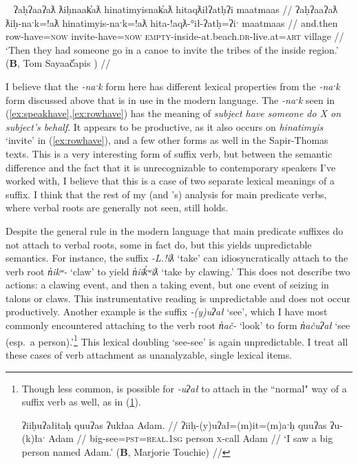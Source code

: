 \ex~ \label{ex:rowhave}
\begingl
\glpreamble ʔaḥʔaaʔaƛ ƛiḥnaak̓aƛ hinatimyisnak̓aƛ hitaqƛiłʔatḥʔi maatmaas //
\gla ʔaḥʔaaʔaƛ ƛiḥ-naˑk=!aƛ hinatimyis-naˑk=!aƛ hita-!aqƛ-°ił-ʔatḥ=ʔiˑ maatmaas //
\glb and.then row-have=\textsc{now} invite-have=\textsc{now} \textsc{empty}-inside-at.beach.\textsc{dr}-live.at=\textsc{art} village //
\glft `Then they had someone go in a canoe to invite the tribes of the inside region.' (\textbf{B}, Tom Sayaač̓apis \citet[p.~297--298]{sapir1955}) //
\endgl
\xe

I believe that the \textit{-naˑk} form here has different lexical properties from the \textit{-naˑk} form discussed above that is in use in the modern language. The \textit{-naˑk} seen in (\ref{ex:speakhave},\ref{ex:rowhave}) has the meaning of \textit{subject have someone do X on subject's behalf}. It appears to be productive, as it also occurs on \textit{hinatimyis} `invite' in (\ref{ex:rowhave}), and a few other forms as well in the Sapir-Thomas texts. This is a very interesting form of suffix verb, but between the semantic difference and the fact that it is unrecognizable to contemporary speakers I've worked with, I believe that this is a case of two separate lexical meanings of a suffix. I think that the rest of my (and \citeauthor{wojdak2005}'s) analysis for main predicate verbs, where verbal roots are generally not seen, still holds.

Despite the general rule in the modern language that main predicate suffixes do not attach to verbal roots, some in fact do, but this yields unpredictable semantics. For instance, the suffix \textit{-L.!iƛ} `take' can idiosyncratically attach to the verb root \textit{n̓ikʷ-} `claw' to yield \textit{n̓iik̓ʷiƛ} `take by clawing.' This does not describe two actions: a clawing event, and then a taking event, but one event of seizing in talons or claws. This instrumentative reading is unpredictable and does not occur productively. Another example is the suffix \textit{-(y)uʔał} `see', which I have most commonly encountered attaching to the verb root \textit{n̓ač-} `look' to form \textit{n̓ačuʔał} `see (esp.\ a person).'\footnote{Though less common, is possible for \textit{-uʔał} to attach in the ``normal" way of a suffix verb as well, as in (\ref{ex:sawabigman}).

\ex \label{ex:sawabigman}
\begingl
\glpreamble ʔiiḥuʔałitaḥ quuʔas ʔukłaa Adam. //
\gla ʔiiḥ-(y)uʔał=(m)it=(m)aˑḥ quuʔas ʔu-(k)łaˑ Adam //
\glb big-see=\textsc{pst}=\textsc{real.1sg} person \textsc{x}-call Adam //
\glft `I saw a big person named Adam.' (\textbf{B}, Marjorie Touchie) //
\endgl
\xe
} This lexical doubling `see-see' is again unpredictable. I treat all these cases of verb attachment as unanalyzable, single lexical items.

